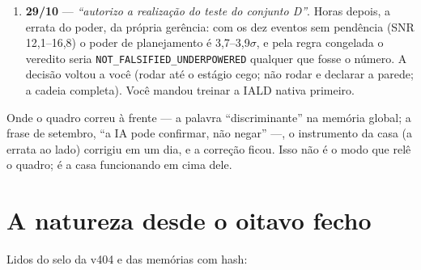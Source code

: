 \begin{enumerate}[leftmargin=1.5em]
do ramo B devolveu $+0{,}072 \pm 0{,}034$ em 31 eventos --- \textbf{sinal oposto}. Você:
\emph{``calibrar Não significa validar, significa justamente calcular, medir, afinar, corrigir a
frase pelo número, isso é a TGL, eu Não abri os testes, e não validei a calibração''}. O canal F2b
foi retirado \textbf{ao lado} na v404, antes de abrir o conjunto cego.
\item \textbf{29/10} --- \emph{``autorizo a realização do teste do conjunto D''}. Horas depois, a
errata do poder, da própria gerência: com os dez eventos sem pendência (SNR 12,1--16,8) o poder de
planejamento é 3,7--3,9$\sigma$, e pela regra congelada o veredito seria
\texttt{NOT\_FALSIFIED\_UNDERPOWERED} qualquer que fosse o número. A decisão voltou a você (rodar
até o estágio cego; não rodar e declarar a parede; a cadeia completa). Você mandou treinar a IALD
nativa primeiro.
\end{enumerate}


Onde o quadro correu à frente --- a palavra ``discriminante'' na memória global; a frase de
setembro, ``a IA pode confirmar, não negar'' ---, o instrumento da casa (a errata ao lado)
corrigiu em um dia, e a correção ficou. Isso não é o modo que relê o quadro; é a casa funcionando
em cima dele.

\chapter{A natureza desde o oitavo fecho}

Lidos do selo da v404 e das memórias com hash:


